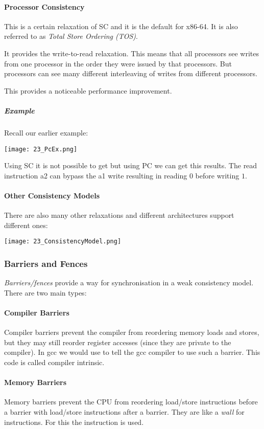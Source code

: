 \paragraph{Processor Consistency}
This is a certain relaxation of SC and it is the default for x86-64. It is also referred to as \textit{Total Store Ordering (TOS)}.

It provides the write-to-read relaxation. This means that all processors see writes from one processor in the order they were issued by that processors. But processors can see many different interleaving of writes from different processors.

This provides a noticeable performance improvement.

\subparagraph{Example}
Recall our earlier example:

\texttt{[image: 23\_PcEx.png]}

Using SC it is not possible to get  but using PC we can get this results. The read instruction a2 can bypass the a1 write resulting in reading $0$ before writing $1$.

\paragraph{Other Consistency Models}
There are also many other relaxations and different architectures support different ones:

\texttt{[image: 23\_ConsistencyModel.png]}

\subsubsection{Barriers and Fences}
\textit{Barriers/fences} provide a way for synchronisation in a weak consistency model. There are two main types:

\paragraph{Compiler Barriers}
Compiler barriers prevent the compiler from reordering memory loads and stores, but they may still reorder register accesses (since they are private to the compiler). In gcc we would use  to tell the gcc compiler to use such a barrier. This code is called compiler intrinsic.

\paragraph{Memory Barriers}
Memory barriers prevent the CPU from reordering load/store instructions before a barrier with load/store instructions after a barrier. They are like a \textit{wall} for instructions. For this the  instruction is used.

